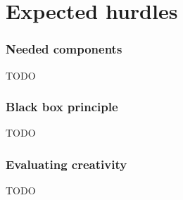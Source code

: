 \part{Expected hurdles}
\label{part:hurdles}


\section{Needed components}
\label{sec:needed_components}

TODO


\section{Black box principle}
\label{sec:black_box}

TODO


\section{Evaluating creativity}
\label{sec:creativity}

TODO